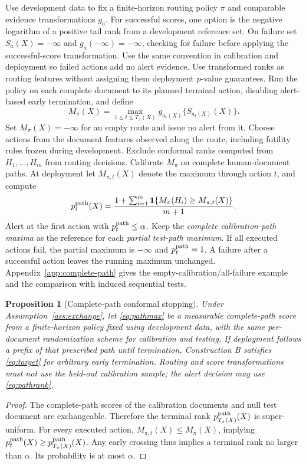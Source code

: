 \documentclass[pdflatex,sn-mathphys-num]{sn-jnl}
\newtheorem{proposition}{Proposition}
\newcommand{\ind}{\mathbf{1}}
\begin{document}
Use development data to fix a finite-horizon routing policy \(\pi\) and comparable evidence transformations \(g_a\). For successful scores, one option is the negative logarithm of a positive tail rank from a development reference set. On failure set \(S_a(X)=-\infty\) and \(g_a(-\infty)=-\infty\), checking for failure before applying the successful-score transformation. Use the same convention in calibration and deployment so failed actions add no alert evidence. Use transformed ranks as routing features without assigning them deployment \(p\)-value guarantees. Run the policy on each complete document to its planned terminal action, disabling alert-based early termination, and define
\begin{equation}
 M_\pi(X)=\max_{1\leq t\leq T_\pi(X)}
       g_{a_t(X)}\{S_{a_t(X)}(X)\}.
 \label{eq:pathmax}
\end{equation}
Set \(M_\pi(X)=-\infty\) for an empty route and issue no alert from it. Choose actions from the document features observed along the route, including futility rules frozen during development. Exclude conformal ranks computed from \(H_1,\ldots,H_m\) from routing decisions. Calibrate \(M_\pi\) on complete human-document paths. At deployment let \(M_{\pi,t}(X)\) denote the maximum through action \(t\), and compute
\begin{equation}
 p^{\rm path}_t(X)=
 \frac{1+\sum_{i=1}^{m}\ind\{M_\pi(H_i)\geq M_{\pi,t}(X)\}}{m+1}.
 \label{eq:pathrank}
\end{equation}
Alert at the first action with \(p^{\rm path}_t\leq\alpha\). Keep the \emph{complete calibration-path maxima} as the reference for each \emph{partial test-path maximum}. If all executed actions fail, the partial maximum is \(-\infty\) and \(p_t^{\rm path}=1\). A failure after a successful action leaves the running maximum unchanged. Appendix~\ref{app:complete-path} gives the empty-calibration/all-failure example and the comparison with induced sequential tests.

\begin{proposition}[Complete-path conformal stopping]\label{prop:path}
Under Assumption~\ref{ass:exchange}, let \eqref{eq:pathmax} be a measurable complete-path score from a finite-horizon policy fixed using development data, with the same per-document randomization scheme for calibration and testing. If deployment follows a prefix of that prescribed path until termination, Construction B satisfies \eqref{eq:target} for arbitrary early termination. Routing and score transformations must not use the held-out calibration sample; the alert decision may use \eqref{eq:pathrank}.
\end{proposition}
\begin{proof}
The complete-path scores of the calibration documents and null test document are exchangeable. Therefore the terminal rank \(p^{\rm path}_{T_\pi(X)}(X)\) is super-uniform. For every executed action, \(M_{\pi,t}(X)\leq M_\pi(X)\), implying \(p^{\rm path}_t(X)\geq p^{\rm path}_{T_\pi(X)}(X)\). Any early crossing thus implies a terminal rank no larger than \(\alpha\). Its probability is at most \(\alpha\).
\end{proof}
\end{document}
